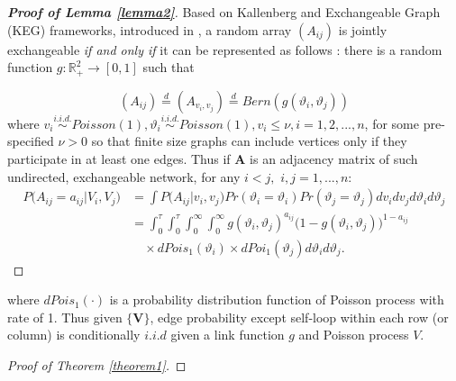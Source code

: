 \documentclass[12pt]{article}
\theoremstyle{definition}
\begin{document}
\begin{proof}[\textbf{Proof of Lemma \ref{lemma2}}]
	Based on Kallenberg and Exchangeable Graph (KEG) frameworks, introduced in \cite{veitch2015class}, a random array $(A_{ij})$ is jointly exchangeable \textit{if and only if} it can be represented as follows : there is a random function $g : \mathbb{R}^{2}_{+} \rightarrow [0,1]$ such that 
	
	\begin{equation}
	(A_{ij})  \stackrel{d}{=} (A_{v_{i}, v_{j}} )  \stackrel{d}{=} Bern( g( \vartheta_{i}, \vartheta_{j}))
	\end{equation}
	where $v_{i} \overset{i.i.d.}{\sim} Poisson(1), \vartheta_{i} \overset{i.i.d.}{\sim} Poisson(1), v_{i} \leq \nu, i = 1,2,... , n$, for some pre-specified $\nu >0$ so that finite size graphs can include vertices only if they participate in at least one edges. Thus if $\mathbf{A}$ is an adjacency matrix of such undirected, exchangeable network, for any $i < j,$ $i,j = 1,... , n$:
\begin{equation}
\begin{split}
	P \big(  A_{ij} = a_{ij} \big| V_{i}, V_{j} \big) & = \int P \big( A_{ij} \big| v_{i}, v_{j} \big) Pr(\vartheta_{i} = \vartheta_{i}) Pr(\vartheta_{j} = \vartheta_{j})   dv_{i} dv_{j} d\vartheta_{i} d\vartheta_{j}   \\ & = \int_{0}^{\tau} \int_{0}^{\tau}   \int_{0}^{\infty} \int_{0}^{\infty}  g( \vartheta_{i},  \vartheta_{j})^{a_{ij}} \big( 1- g( \vartheta_{i},  \vartheta_{j}) \big)^{1-a_{ij}}  \\ & \quad \times dPois_{1}(\vartheta_{i}) \times dPoi_{1}(\vartheta_{j})  d \vartheta_{i} d \vartheta_{j}.
\end{split}
\end{equation}
\end{proof}
where $dPois_{1}(\cdot)$ is a probability distribution function of Poisson process with rate of 1.  Thus given $\{ \mathbf{V} \}$, edge probability except self-loop within each row (or column) is conditionally $\textit{i.i.d}$ given a link function $g$ and Poisson process $V$.


	
\begin{proof}[Proof of Theorem \ref{theorem1}]
\end{proof}
	
\end{document}

